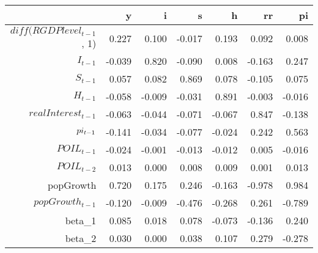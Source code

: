 \begin{table}[ht]
\centering
\begin{tabular}{rrrrrrr}
  \hline
 & y & i & s & h & rr & pi \\ 
  \hline
$diff(RGDPlevel_{t-1}$, 1) & 0.227 & 0.100 & -0.017 & 0.193 & 0.092 & 0.008 \\ 
  $I_{t-1}$ & -0.039 & 0.820 & -0.090 & 0.008 & -0.163 & 0.247 \\ 
  $S_{t-1}$ & 0.057 & 0.082 & 0.869 & 0.078 & -0.105 & 0.075 \\ 
  $H_{t-1}$ & -0.058 & -0.009 & -0.031 & 0.891 & -0.003 & -0.016 \\ 
  $realInterest_{t-1}$ & -0.063 & -0.044 & -0.071 & -0.067 & 0.847 & -0.138 \\ 
  $\\pi_{t-1}$ & -0.141 & -0.034 & -0.077 & -0.024 & 0.242 & 0.563 \\ 
  $POIL_{t-1}$ & -0.024 & -0.001 & -0.013 & -0.012 & 0.005 & -0.016 \\ 
  $POIL_{t-2}$ & 0.013 & 0.000 & 0.008 & 0.009 & 0.001 & 0.013 \\ 
  popGrowth & 0.720 & 0.175 & 0.246 & -0.163 & -0.978 & 0.984 \\ 
  $popGrowth_{t-1}$ & -0.120 & -0.009 & -0.476 & -0.268 & 0.261 & -0.789 \\ 
  beta_1 & 0.085 & 0.018 & 0.078 & -0.073 & -0.136 & 0.240 \\ 
  beta_2 & 0.030 & 0.000 & 0.038 & 0.107 & 0.279 & -0.278 \\ 
   \hline
\end{tabular}
\end{table}
